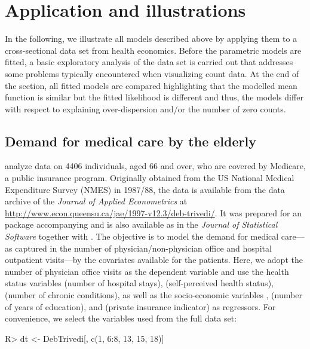 \documentclass{Z}
\begin{document}
\section{Application and illustrations} \label{sec:illustrations}

In the following, we illustrate all models described above by applying
them to a cross-sectional data set from health economics. Before the parametric models are fitted,
a basic exploratory analysis of the data set is carried out that addresses
some problems typically encountered when visualizing count data. At the
end of the section, all fitted models are compared highlighting that
the modelled mean function is similar but the fitted likelihood
is different and thus, the models differ with respect to explaining
over-dispersion and/or the number of zero counts.


\subsection{Demand for medical care by the elderly}

\cite{countreg:Deb+Trivedi:1997} analyze data on 4406
individuals, aged 66 and over, who are covered by Medicare, a public
insurance program. Originally obtained from the US National Medical
Expenditure Survey (NMES) in 1987/88, the data is available from the data archive of the
\textit{Journal of Applied Econometrics} at
\url{http://www.econ.queensu.ca/jae/1997-v12.3/deb-trivedi/}. It was
prepared for an  package accompanying
\cite{countreg:Kleiber+Zeileis:2008} and is also available as
 in the \textit{Journal of Statistical Software}
together with \cite{countreg:Zeileis:2006}. The objective is to model
the demand for medical care---as captured in the number of physician/non-physician
office and hospital outpatient visits---by the covariates available
for the patients. Here, we adopt the number of physician office visits 
as the dependent variable and use the health status variables
 (number of hospital stays),
 (self-perceived health status),
 (number of chronic conditions),
as well as the socio-economic variables
,
 (number of years of education), and
 (private insurance indicator) as regressors. For convenience, we
select the variables used from the full data set:

\begin{Schunk}
\begin{Sinput}
R> dt <- DebTrivedi[, c(1, 6:8, 13, 15, 18)]
\end{Sinput}
\end{Schunk}
\end{document}

